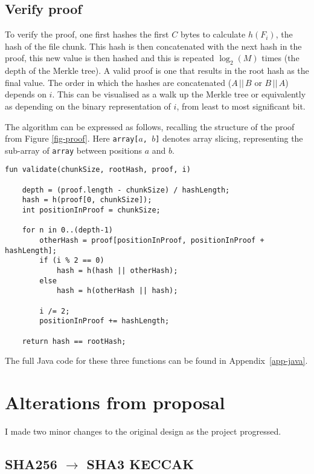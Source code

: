 \documentclass[12pt,a4paper,twoside,openright]{report}
\begin{document}
\subsection{Verify proof}

To verify the proof, one first hashes the first $C$ bytes to calculate $h(F_i)$, the hash of the file chunk.
This hash is then concatenated with the next hash in the proof,
this new value is then hashed and this is repeated $\log_2(M)$ times (the depth of the Merkle tree).
A valid proof is one that results in the root hash as the final value.
The order in which the hashes are concatenated ($A \,||\, B$ or $B \, || \, A$) depends on $i$.
This can be visualised as a walk up the Merkle tree or
equivalently as depending on the binary representation of $i$, from least to most significant bit.

The algorithm can be expressed as follows, recalling the structure of the proof from Figure \ref{fig-proof}.
Here \texttt{array[$a$, $b$]} denotes array slicing, representing the sub-array of \texttt{array} between positions $a$ and $b$.

\begin{lstlisting}
fun validate(chunkSize, rootHash, proof, i)
    
    depth = (proof.length - chunkSize) / hashLength;
    hash = h(proof[0, chunkSize]);
    int positionInProof = chunkSize;
    
    for n in 0..(depth-1)
        otherHash = proof[positionInProof, positionInProof + hashLength];
        if (i % 2 == 0)
            hash = h(hash || otherHash);
        else
            hash = h(otherHash || hash);
        
        i /= 2;
        positionInProof += hashLength;
    
    return hash == rootHash;
\end{lstlisting}

The full Java code for these three functions can be found in Appendix~\ref{app-java}.


\section{Alterations from proposal}
\label{impl-changes}

I made two minor changes to the original design as the project progressed.

\subsection{SHA256 $\to$ SHA3 KECCAK}\label{impl-keccak}
\end{document}
